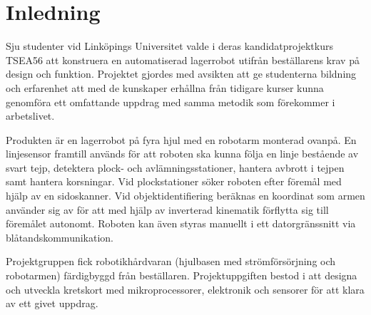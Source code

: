 

\section{Inledning}
Sju studenter vid Linköpings Universitet valde i deras kandidatprojektkurs TSEA56 att konstruera en automatiserad lagerrobot utifrån beställarens krav på design och funktion. Projektet gjordes med avsikten att ge studenterna bildning och erfarenhet att med de kunskaper erhållna från tidigare kurser kunna genomföra ett omfattande uppdrag med samma metodik som förekommer i arbetslivet.

Produkten är en lagerrobot på fyra hjul med en robotarm monterad ovanpå. En linjesensor framtill används för att roboten ska kunna följa en linje bestående av svart tejp, detektera plock- och avlämningsstationer, hantera avbrott i tejpen samt hantera korsningar. Vid plockstationer söker roboten efter föremål med hjälp av en sidoskanner. Vid objektidentifiering beräknas en koordinat som armen använder sig av för att med hjälp av inverterad kinematik förflytta sig till föremålet autonomt. Roboten kan även styras manuellt i ett datorgränssnitt via blåtandskommunikation. 

Projektgruppen fick robotikhårdvaran (hjulbasen med strömförsörjning och robotarmen) färdigbyggd från beställaren. Projektuppgiften bestod i att designa och utveckla kretskort med mikroprocessorer, elektronik och sensorer för att klara av ett givet uppdrag. 